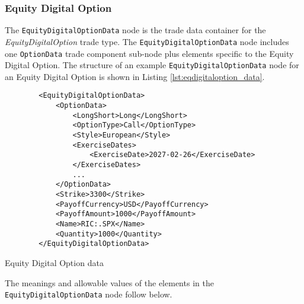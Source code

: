 \subsubsection{Equity Digital Option}

The \lstinline!EquityDigitalOptionData!  node is the trade data container for the \emph{EquityDigitalOption} trade type. The \lstinline!EquityDigitalOptionData!  node includes one  \lstinline!OptionData! trade component sub-node  plus elements
specific to the Equity Digital  Option. The structure of an example \lstinline!EquityDigitalOptionData! node for an Equity Digital Option is shown in Listing
\ref{lst:eqdigitaloption_data}.

\begin{listing}[H]
\begin{verbatim}
        <EquityDigitalOptionData>
            <OptionData>
                <LongShort>Long</LongShort>
                <OptionType>Call</OptionType>
                <Style>European</Style>
                <ExerciseDates>
                    <ExerciseDate>2027-02-26</ExerciseDate>
                </ExerciseDates>
                ...
            </OptionData>
            <Strike>3300</Strike>
            <PayoffCurrency>USD</PayoffCurrency>
            <PayoffAmount>1000</PayoffAmount>
            <Name>RIC:.SPX</Name>
            <Quantity>1000</Quantity>
        </EquityDigitalOptionData>
\end{verbatim}
\caption{Equity Digital Option data}
\label{lst:eqdigitaloption_data}
\end{listing}

The meanings and allowable values of the elements in the \lstinline!EquityDigitalOptionData!  node follow below.

